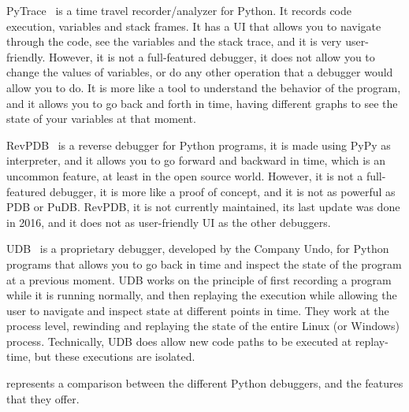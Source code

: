 PyTrace~\cite{pytrace} is a time travel recorder/analyzer for Python. It records code execution, 
variables and stack frames. It has a UI that allows you to navigate through the code, 
see the variables and the stack trace, and it is very user-friendly. However, it is not 
a full-featured debugger, it does not allow you to change the values of variables, or do 
any other operation that a debugger would allow you to do. It is more like a tool to 
understand the behavior of the program, and it allows you to go back and forth in time, 
having different graphs to see the state of your variables at that moment.

\ac{RevPDB}~\cite{revdeb} is a reverse debugger for Python programs, it is made using PyPy as interpreter,
and it allows you to go forward and backward in time, which is an uncommon feature, at least 
in the open source world. However, it is not a full-featured debugger, it is more like a 
proof of concept, and it is not as powerful as \ac{PDB} or PuDB. \ac{RevPDB}, it is not 
currently maintained, its last update was done in 2016, and it does not as 
user-friendly UI as the other debuggers.

\ac{UDB}~\cite{udb} is a proprietary debugger, developed by the Company 
Undo, for Python programs that allows you to go back in time 
and inspect the state of the program at a previous moment. \ac{UDB} works on the principle of first recording 
a program while it is running normally, and then replaying the execution while allowing the 
user to navigate and inspect state at different points in time. They work at the process 
level, rewinding and replaying the state of the entire Linux (or Windows) process. Technically, 
\ac{UDB} does allow new code paths to be executed at replay-time, but these executions are 
isolated.

 represents a comparison between the different Python debuggers, 
and the features that they offer. 

